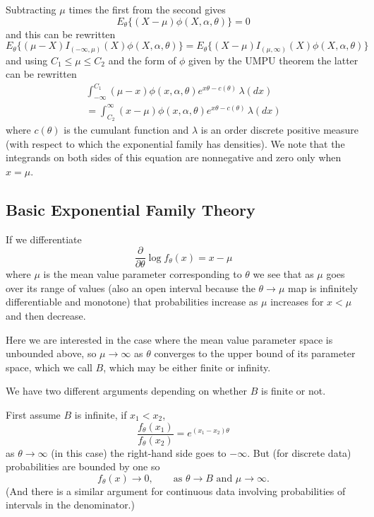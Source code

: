 \documentclass[11pt]{article}
\begin{document}
Subtracting $\mu$ times the first from the second gives
$$
   E_\theta\{ (X - \mu) \phi(X, \alpha, \theta) \} = 0
$$
and this can be rewritten
$$
   E_\theta\{ (\mu - X) I_{(- \infty, \mu)}(X) \phi(X, \alpha, \theta) \}
   =
   E_\theta\{ (X - \mu) I_{(\mu, \infty)}(X) \phi(X, \alpha, \theta) \}
$$
and using $C_1 \le \mu \le C_2$ and the form of $\phi$ given
by the UMPU theorem the latter can be rewritten
\begin{multline*}
   \int_{- \infty}^{C_1} (\mu - x) \phi(x, \alpha, \theta)
   e^{x \theta - c(\theta)} \, \lambda(d x)
   \\
   =
   \int_{C_2}^\infty (x - \mu) \phi(x, \alpha, \theta)
   e^{x \theta - c(\theta)} \, \lambda(d x)
\end{multline*}
where $c(\theta)$ is the cumulant function and $\lambda$ is an order
discrete positive measure (with respect to which the exponential family
has densities).  We note that the integrands on both sides of this
equation are nonnegative and zero only when $x = \mu$.

\subsection{Basic Exponential Family Theory}

If we differentiate
$$
   \frac{\partial}{\partial \theta} \log f_\theta(x) = x - \mu
$$
where $\mu$ is the mean value parameter corresponding to $\theta$
we see that as $\mu$ goes over its range of values (also an open interval
because the $\theta \to \mu$ map is infinitely differentiable and monotone)
that probabilities increase as $\mu$ increases for $x < \mu$ and then decrease.

Here we are interested in the case where the mean value parameter space is
unbounded above, so $\mu \to \infty$ as $\theta$ converges to the upper
bound of its parameter space, which we call $B$, which may be either finite
or infinity.

We have two different arguments depending on whether $B$ is finite or not.

First assume $B$ is infinite, if $x_1 < x_2$,
$$
   \frac{f_\theta(x_1)}{f_\theta(x_2)} = e^{(x_1 - x_2) \theta}
$$
as $\theta \to \infty$ (in this case) the right-hand side goes to $- \infty$.
But (for discrete data) probabilities are bounded by one so
\begin{equation} \label{eq:limit-zero}
   f_\theta(x) \to 0, \qquad \text{as $\theta \to B$ and $\mu \to \infty$}.
\end{equation}
(And there is a similar argument for continuous data involving probabilities
of intervals in the denominator.)
\end{document}
